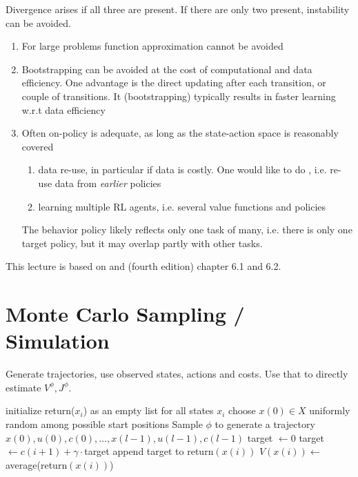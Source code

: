 Divergence arises if all three are present. 
If there are only two present, instability can be avoided.
\begin{enumerate}
    \item For large problems function approximation cannot be avoided
    \item Bootstrapping can be avoided at the cost of computational and data efficiency. One advantage is the direct updating after each transition, or couple of transitions. It (bootstrapping) typically results in faster learning w.r.t data efficiency 
    \item Often on-policy is adequate, as long as the state-action space is reasonably covered \begin{enumerate}
        \item data re-use, in particular if data is costly. One would like to do , i.e. re-use data from \textit{earlier} policies
        \item learning multiple RL agents, i.e. several value functions and policies 
    \end{enumerate} 
              The behavior policy likely reflects only one task of many, i.e. there is only one target policy, but it may overlap partly with other tasks.
\end{enumerate}

This lecture is based on \cite{Bohn.Garcke.Griebel:2024} and \cite{Bertsekas2000} (fourth edition) chapter 6.1 and 6.2. 

\section{Monte Carlo Sampling / Simulation}

 Generate trajectories, use observed states,
actions and costs. Use that to directly estimate \(V^\phi, J^\phi\).

\begin{algorithm}[H]
    \caption{Episodes first-visit  MC policy evaluation}\label{alg:fvmcpe}
    \begin{algorithmic}
    \State initialize return(\(x_i\)) as an empty list for all states \(x_i\)
        \State choose \(x(0)\in X\) uniformly random among possible start positions
        \State Sample \(\phi\) to generate a trajectory \(x(0),u(0),c(0),\dots, x(l-1),u(l-1),c(l-1)\)
        \State target \(\leftarrow 0\)
            \State target \(\leftarrow c(i+1)+\gamma\cdot\)target 
                \State append target to return\((x(i))\)
                \State \(V(x(i))\leftarrow \) average(return\((x(i))\))
            \EndIf
        \EndFor
    \EndWhile
\end{algorithmic}
\end{algorithm}

